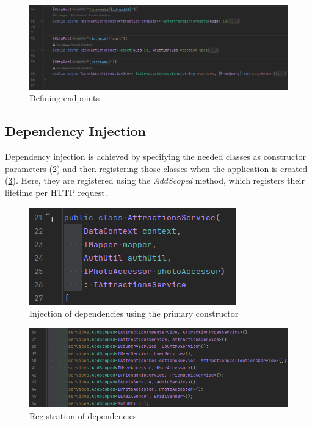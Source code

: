 \begin{figure}[!ht]
    \centering
    \includegraphics[width=1\linewidth]{4.3.4_url-mapping-endpoints.png}
    \caption{Defining endpoints}
    \label{fig:url-mapping-endpoints}
\end{figure}

\subsection{Dependency Injection}

\par Dependency injection is achieved by specifying the needed classes as constructor parameters (\ref{fig:dependency-injection_usage}) and then registering those classes when the application is created (\ref{fig:dependency-injection_registering}). Here, they are registered using the \textit{AddScoped} method, which registers their lifetime per HTTP request.


\begin{figure}[!ht]
    \centering
    \includegraphics[width=0.5\linewidth]{dependency-injection_usage.png}
    \caption{Injection of dependencies using the primary constructor}
    \label{fig:dependency-injection_usage}
\end{figure}

\begin{figure}
    \centering
    \includegraphics[width=1\linewidth]{dependency-injection_registering.png}
    \caption{Registration of dependencies}
    \label{fig:dependency-injection_registering}
\end{figure}

